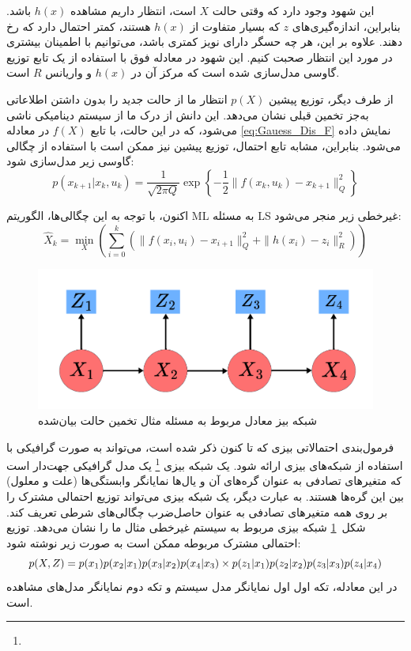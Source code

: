 این شهود وجود دارد که وقتی حالت \(X\) است، انتظار داریم مشاهده \(h(x)\) باشد. بنابراین،
اندازه‌گیری‌های \(z\) که بسیار متفاوت از \(h(x)\) هستند، کمتر احتمال دارد که رخ دهند. علاوه بر این،
هر چه حسگر دارای نویز کمتری باشد، می‌توانیم با اطمینان بیشتری در مورد این انتظار صحبت کنیم. این
شهود در معادله فوق با استفاده از یک تابع توزیع گاوسی مدل‌سازی شده است که
مرکز آن در \(h(x)\) و واریانس \(R\) است.

از طرف دیگر، توزیع پیشین \(p(X)\) انتظار ما از حالت جدید را بدون داشتن اطلاعاتی به‌جز تخمین قبلی نشان می‌دهد. این دانش از
درک ما از سیستم دینامیکی ناشی می‌شود، که در این حالت، با تابع \(f(X)\)
در معادله
\ref{eq:Gauess_Dis_F}
 نمایش داده می‌شود. بنابراین، مشابه تابع احتمال، توزیع پیشین نیز ممکن است
با استفاده از چگالی گاوسی زیر مدل‌سازی شود:
\begin{equation} \label{eq:Gauess_Dis_F}
	p(x_{k+1}|x_k, u_k) = \frac{1}{\sqrt{2\pi Q}} \exp \left\{ -\frac{1}{2} \| f(x_k, u_k) - x_{k+1} \|_Q^2 \right\}
\end{equation}

اکنون، با توجه به این چگالی‌ها، الگوریتم ML به مسئله LS غیرخطی زیر
منجر می‌شود:
\begin{equation}
	\hat{X}_k = \min_X \left( \sum_{i=0}^k \left(\| f(x_i, u_i) - x_{i+1} \|_Q^2 + \| h(x_i) - z_i \|_R^2 \right) \right)
\end{equation}

\begin{figure} [!t]
	\centering
	\includegraphics[width=0.5\linewidth]{img/BeyseNetAppendix}
	\caption{شبکه بیز معادل مربوط به مسئله مثال  تخمین حالت بیان‌شده}
	\label{fig:beysenetappendix}
\end{figure}

فرمول‌بندی احتمالاتی بیزی که تا کنون ذکر شده است، می‌تواند به صورت گرافیکی
با استفاده از شبکه‌های بیزی ارائه شود. یک شبکه بیزی
\footnote{}
یک مدل گرافیکی جهت‌دار است
که متغیرهای تصادفی به عنوان گره‌های آن و یال‌ها نمایانگر وابستگی‌ها (علت و معلول)
بین این گره‌ها هستند. به عبارت دیگر، یک شبکه بیزی می‌تواند توزیع احتمالی مشترک
را بر روی همه متغیرهای تصادفی به عنوان حاصل‌ضرب چگالی‌های شرطی تعریف کند. شکل~\ref{fig:beysenetappendix}
شبکه بیزی مربوط به سیستم غیرخطی مثال ما را نشان می‌دهد. توزیع احتمالی مشترک
مربوطه ممکن است به صورت زیر نوشته شود:
\begin{equation}
	p(X, Z) = p(x_1) p(x_2|x_1) p(x_3|x_2) p(x_4|x_3) \newline
	\times p(z_1|x_1) p(z_2|x_2) p(z_3|x_3) p(z_4|x_4)
\end{equation}
در این معادله، تکه اول اول نمایانگر مدل سیستم و تکه دوم
نمایانگر مدل‌های مشاهده است.

